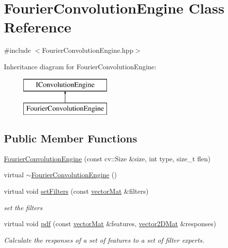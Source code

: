 \hypertarget{class_fourier_convolution_engine}{\section{Fourier\-Convolution\-Engine Class Reference}
\label{class_fourier_convolution_engine}
}


{\ttfamily \#include $<$Fourier\-Convolution\-Engine.\-hpp$>$}

Inheritance diagram for Fourier\-Convolution\-Engine\-:\begin{figure}[H]
\begin{center}
\leavevmode
\includegraphics[height=2.000000cm]{class_fourier_convolution_engine}
\end{center}
\end{figure}
\subsection*{Public Member Functions}
\begin{DoxyCompactItemize}
\item 
\hyperlink{class_fourier_convolution_engine_a30d60a44b5767b43a4042171cf813fcd}{Fourier\-Convolution\-Engine} (const cv\-::\-Size \&size, int type, size\-\_\-t flen)
\item 
virtual \hyperlink{class_fourier_convolution_engine_a827dafdecfbb07891fbeee998af60236}{$\sim$\-Fourier\-Convolution\-Engine} ()
\item 
virtual void \hyperlink{class_fourier_convolution_engine_ad895979797d38a7c97e8dfcca9571fd2}{set\-Filters} (const \hyperlink{types_8hpp_a3207a7addcfa415d1c83622febcb1e9b}{vector\-Mat} \&filters)
\begin{DoxyCompactList}\small\item\em set the filters \end{DoxyCompactList}\item 
virtual void \hyperlink{class_fourier_convolution_engine_a30e84c8f67a198d318780e247efbbe41}{pdf} (const \hyperlink{types_8hpp_a3207a7addcfa415d1c83622febcb1e9b}{vector\-Mat} \&features, \hyperlink{types_8hpp_a33cacb85be7b8df3dc0b67d5d849f4cc}{vector2\-D\-Mat} \&responses)
\begin{DoxyCompactList}\small\item\em Calculate the responses of a set of features to a set of filter experts. \end{DoxyCompactList}\end{DoxyCompactItemize}
